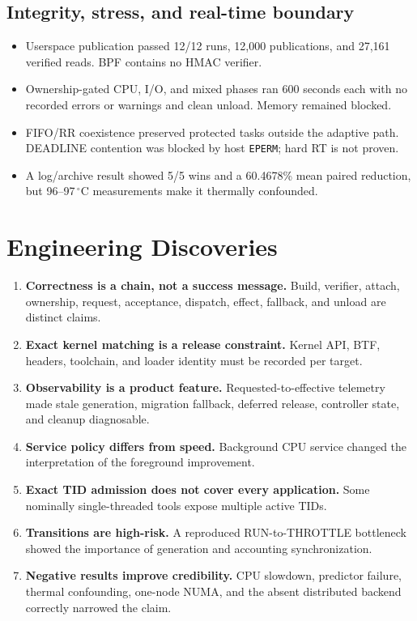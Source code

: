 \documentclass[11pt,a4paper,oneside]{report}
\begin{document}
\section{Integrity, stress, and real-time boundary}

\begin{itemize}
 \item Userspace publication passed 12/12 runs, 12,000 publications, and 27,161
 verified reads. BPF contains no HMAC verifier.
 \item Ownership-gated CPU, I/O, and mixed phases ran 600 seconds each with no
 recorded errors or warnings and clean unload. Memory remained blocked.
 \item FIFO/RR coexistence preserved protected tasks outside the adaptive path.
 DEADLINE contention was blocked by host \texttt{EPERM}; hard RT is not proven.
 \item A log/archive result showed 5/5 wins and a 60.4678\% mean paired
 reduction, but 96--97\,$^\circ$C measurements make it thermally confounded.
\end{itemize}

\chapter{Engineering Discoveries}

\begin{enumerate}
 \item \textbf{Correctness is a chain, not a success message.} Build, verifier,
 attach, ownership, request, acceptance, dispatch, effect, fallback, and unload
 are distinct claims.
 \item \textbf{Exact kernel matching is a release constraint.} Kernel API, BTF,
 headers, toolchain, and loader identity must be recorded per target.
 \item \textbf{Observability is a product feature.} Requested-to-effective
 telemetry made stale generation, migration fallback, deferred release,
 controller state, and cleanup diagnosable.
 \item \textbf{Service policy differs from speed.} Background CPU service
 changed the interpretation of the foreground improvement.
 \item \textbf{Exact TID admission does not cover every application.} Some
 nominally single-threaded tools expose multiple active TIDs.
 \item \textbf{Transitions are high-risk.} A reproduced RUN-to-THROTTLE
 bottleneck showed the importance of generation and accounting synchronization.
 \item \textbf{Negative results improve credibility.} CPU slowdown, predictor
 failure, thermal confounding, one-node NUMA, and the absent distributed backend
 correctly narrowed the claim.
\end{enumerate}
\end{document}
